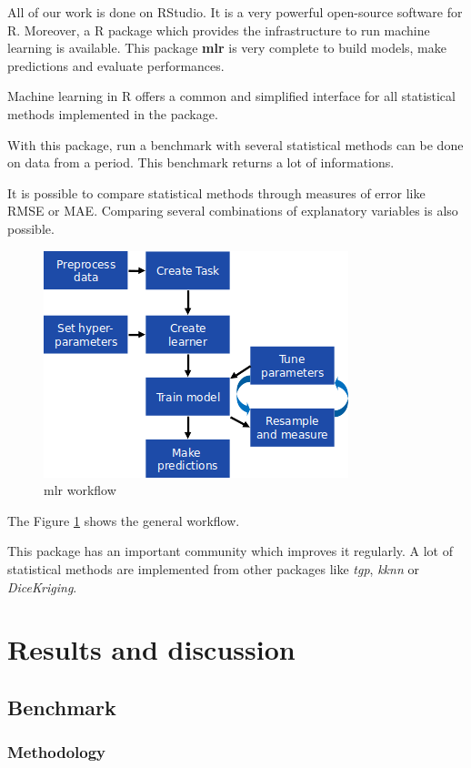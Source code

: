 \documentclass[12pt,twoside]{reedthesis}
\theoremstyle{definition}
\theoremstyle{definition}
\theoremstyle{definition}
\theoremstyle{remark}
\begin{document}
All of our work is done on RStudio. It is a very powerful open-source
software for R. Moreover, a R package which provides the infrastructure
to run machine learning is available. This package \textbf{mlr} is very
complete to build models, make predictions and evaluate performances.

Machine learning in R offers a common and simplified interface for all
statistical methods implemented in the package.

With this package, run a benchmark with several statistical methods can
be done on data from a period. This benchmark returns a lot of
informations.

It is possible to compare statistical methods through measures of error
like RMSE or MAE. Comparing several combinations of explanatory
variables is also possible.
\begin{figure}

{\centering \includegraphics[width=0.5\linewidth]{figure/mlr_workflow} 

}

\caption{mlr workflow}\label{fig:mlr}
\end{figure}
The Figure \ref{fig:mlr} shows the general workflow.

This package has an important community which improves it regularly. A
lot of statistical methods are implemented from other packages like
\emph{tgp}, \emph{kknn} or \emph{DiceKriging}.

\chapter{Results and discussion}\label{results}

\section{Benchmark}\label{benchmark}

\subsection{Methodology}\label{methodology}
\end{document}
